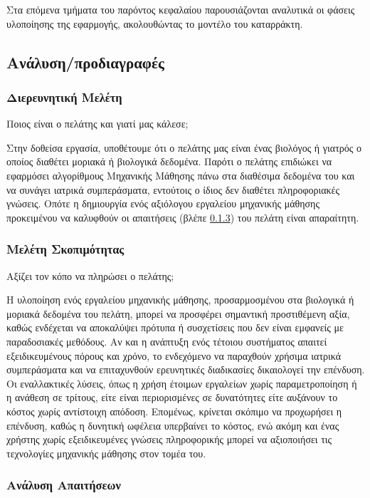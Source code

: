 \documentclass{article}  %
\begin{document}
Στα επόμενα τμήματα του παρόντος κεφαλαίου παρουσιάζονται αναλυτικά οι φάσεις υλοποίησης της εφαρμογής, ακολουθώντας το μοντέλο του καταρράκτη.

\subsection{Ανάλυση/προδιαγραφές}

\subsubsection{Διερευνητική Μελέτη}

    Ποιος είναι ο πελάτης και γιατί μας κάλεσε;

    Στην δοθείσα εργασία, υποθέτουμε ότι ο πελάτης μας είναι ένας βιολόγος ή γιατρός ο οποίος διαθέτει μοριακά ή βιολογικά δεδομένα. Παρότι ο πελάτης επιδιώκει να εφαρμόσει αλγορίθμους Μηχανικής Μάθησης πάνω στα διαθέσιμα δεδομένα του και να συνάγει ιατρικά συμπεράσματα, εντούτοις ο ίδιος δεν διαθέτει πληροφοριακές γνώσεις. Οπότε η δημιουργία ενός αξιόλογου εργαλείου μηχανικής μάθησης προκειμένου να καλυφθούν οι απαιτήσεις (βλέπε \ref{sec:requirements}) του πελάτη είναι απαραίτητη.

\subsubsection{Μελέτη Σκοπιμότητας}

    Αξίζει τον κόπο να πληρώσει ο πελάτης;

    Η υλοποίηση ενός εργαλείου μηχανικής μάθησης, προσαρμοσμένου στα βιολογικά ή μοριακά δεδομένα του πελάτη, μπορεί να προσφέρει σημαντική προστιθέμενη αξία, καθώς ενδέχεται να αποκαλύψει πρότυπα ή συσχετίσεις που δεν είναι εμφανείς με παραδοσιακές μεθόδους. Αν και η ανάπτυξη ενός τέτοιου συστήματος απαιτεί εξειδικευμένους πόρους και χρόνο, το ενδεχόμενο να παραχθούν χρήσιμα ιατρικά συμπεράσματα και να επιταχυνθούν ερευνητικές διαδικασίες δικαιολογεί την επένδυση. Οι εναλλακτικές λύσεις, όπως η χρήση έτοιμων εργαλείων χωρίς παραμετροποίηση ή η ανάθεση σε τρίτους, είτε είναι περιορισμένες σε δυνατότητες είτε αυξάνουν το κόστος χωρίς αντίστοιχη απόδοση. Επομένως, κρίνεται σκόπιμο να προχωρήσει η επένδυση, καθώς η δυνητική ωφέλεια υπερβαίνει το κόστος, ενώ ακόμη και ένας χρήστης χωρίς εξειδικευμένες γνώσεις πληροφορικής μπορεί να αξιοποιήσει τις τεχνολογίες μηχανικής μάθησης στον τομέα του.
    
    

\subsubsection{Ανάλυση Απαιτήσεων}
\label{sec:requirements}
\end{document}
